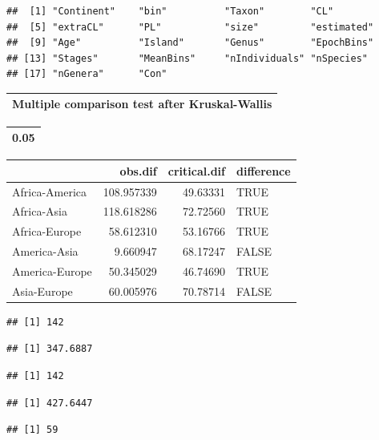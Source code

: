 \documentclass[]{article}
\begin{document}
\begin{verbatim}
##  [1] "Continent"    "bin"          "Taxon"        "CL"          
##  [5] "extraCL"      "PL"           "size"         "estimated"   
##  [9] "Age"          "Island"       "Genus"        "EpochBins"   
## [13] "Stages"       "MeanBins"     "nIndividuals" "nSpecies"    
## [17] "nGenera"      "Con"
\end{verbatim}

\begin{table}

\centering
\begin{tabular}[t]{l}
\hline
Multiple comparison test after Kruskal-Wallis\\
\hline
\end{tabular}
\centering
\begin{tabular}[t]{r}
\hline
0.05\\
\hline
\end{tabular}
\centering
\begin{tabular}[t]{l|r|r|l}
\hline
  & obs.dif & critical.dif & difference\\
\hline
Africa-America & 108.957339 & 49.63331 & TRUE\\
\hline
Africa-Asia & 118.618286 & 72.72560 & TRUE\\
\hline
Africa-Europe & 58.612310 & 53.16766 & TRUE\\
\hline
America-Asia & 9.660947 & 68.17247 & FALSE\\
\hline
America-Europe & 50.345029 & 46.74690 & TRUE\\
\hline
Asia-Europe & 60.005976 & 70.78714 & FALSE\\
\hline
\end{tabular}
\end{table}

\begin{verbatim}
## [1] 142
\end{verbatim}

\begin{verbatim}
## [1] 347.6887
\end{verbatim}

\begin{verbatim}
## [1] 142
\end{verbatim}

\begin{verbatim}
## [1] 427.6447
\end{verbatim}

\begin{verbatim}
## [1] 59
\end{verbatim}
\end{document}
